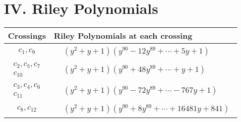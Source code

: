 \documentclass[1p]{elsarticle_modified}
\theoremstyle{definition}
\begin{document}
\centering \section*{ IV. Riley Polynomials}
\begin{tabular}{m{50pt}|m{274pt}}
Crossings & \hspace{64pt}Riley Polynomials at each crossing \\
\hline $$\begin{aligned}c_{1},c_{9}\end{aligned}$$&$\begin{aligned}
&(y^2+y+1)(y^{90}-12 y^{89}+\cdots+5 y+1)
\end{aligned}$\\
\hline $$\begin{aligned}c_{2},c_{5},c_{7}\\c_{10}\end{aligned}$$&$\begin{aligned}
&(y^2+y+1)(y^{90}+48 y^{89}+\cdots+y+1)
\end{aligned}$\\
\hline $$\begin{aligned}c_{3},c_{4},c_{6}\\c_{11}\end{aligned}$$&$\begin{aligned}
&(y^2+y+1)(y^{90}-72 y^{89}+\cdots-767 y+1)
\end{aligned}$\\
\hline $$\begin{aligned}c_{8},c_{12}\end{aligned}$$&$\begin{aligned}
&(y^2+y+1)(y^{90}+8 y^{89}+\cdots+16481 y+841)
\end{aligned}$\\
\hline
\end{tabular}
\vskip 2pc
\end{document}
